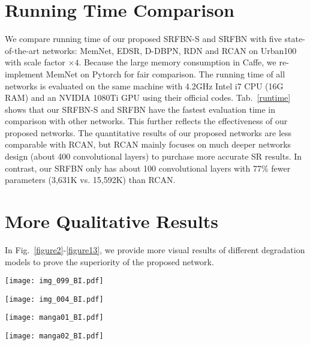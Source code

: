 \documentclass[10pt,twocolumn,letterpaper]{article}
\begin{document}
\section{Running Time Comparison}
 We compare running time of our proposed SRFBN-S and SRFBN with five state-of-the-art networks: MemNet\cite{tai2017memnet}, EDSR\cite{lim2017enhanced}, D-DBPN\cite{Haris_2018_CVPR}, RDN\cite{Zhang_2018_CVPR} and RCAN\cite{zhang2018rcan} on Urban100 with scale factor $\times4$. Because the large memory consumption in Caffe, we re-implement MemNet on Pytorch for fair comparison. The running time of all networks is evaluated on the same machine with 4.2GHz Intel i7 CPU (16G RAM) and an NVIDIA 1080Ti GPU using their official codes. Tab.~\ref{runtime} shows that our SRFBN-S and SRFBN have the fastest evaluation time in comparison with other networks. This further reflects the effectiveness of our proposed networks. The quantitative results of our proposed networks are less comparable with RCAN, but RCAN mainly focuses on much deeper networks design (about 400 convolutional layers) to purchase more accurate SR results. In contrast, our SRFBN only has about 100 convolutional layers with 77\% fewer parameters (3,631K vs. 15,592K) than RCAN.


\section{More Qualitative Results}
In Fig.~\ref{figure2}-\ref{figure13}, we provide more visual results of different degradation models to prove the superiority of the proposed network.



\begin{figure*}[h]
	\centering
	\texttt{[image: img\_099\_BI.pdf]}
	\caption{Visual results of \textbf{BI} degradation model with scale factor $\times 4$.}\label{figure2}
\end{figure*}
\begin{figure*}[h]
	\centering
	\texttt{[image: img\_004\_BI.pdf]}
	\caption{Visual results of \textbf{BI} degradation model with scale factor $\times 4$.}\end{figure*}
\begin{figure*}[h]
	\centering
	\texttt{[image: manga01\_BI.pdf]}
	\caption{Visual results of \textbf{BI} degradation model with scale factor $\times 4$.}\end{figure*}
\begin{figure*}[h]
	\centering
	\texttt{[image: manga02\_BI.pdf]}
	\caption{Visual results of \textbf{BI} degradation model with scale factor $\times 4$.}\end{figure*}
\end{document}
